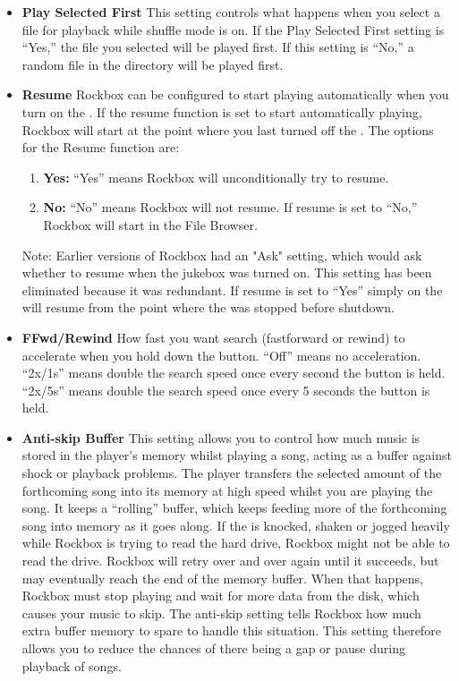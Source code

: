 \begin{itemize}
  \item \textbf{Play Selected First}
    This setting controls what happens when you select a file for playback while shuffle mode is on. If the Play Selected First setting is ``Yes,'' the file you selected will be played first. If this setting is ``No,'' a random file in the directory will be played first.
  \item \textbf{Resume}
    Rockbox can be configured to start playing automatically when you turn on the \dap.  If the resume function is set to start automatically playing, Rockbox will start at the point where you last turned off the \dap.  The options for the Resume function are:
    \begin{enumerate}
    \item\textbf{Yes:  }``Yes'' means Rockbox will unconditionally try to resume.
    \item\textbf{No:  }``No'' means Rockbox will not resume. If resume is set to ``No,'' Rockbox will start in the File Browser.
    \end{enumerate}
    Note:  Earlier versions of Rockbox had an "Ask" setting, which would ask whether to resume when the jukebox was turned on. This setting has been eliminated because it was redundant. If resume is set to ``Yes'' simply on the \dap will resume from the point where the \dap was stopped before shutdown.

  \item \textbf{FFwd/Rewind}
    How fast you want search (fastforward or rewind) to accelerate when you hold down the button. ``Off'' means no acceleration. ``2x/1s'' means double the search speed once every second the button is held. ``2x/5s'' means double the search speed once every 5 seconds the button is held.

  \item \textbf{Anti-skip Buffer}
  This setting allows you to control how much music is stored in the player's memory whilst playing a song, acting as a buffer against shock or playback problems.  The player transfers the selected amount of the forthcoming song into its memory at high speed whilst you are playing the song. It keeps a ``rolling'' buffer, which keeps feeding more of the forthcoming song into memory as it goes along. If the \dap is knocked, shaken or jogged heavily while Rockbox is trying to read the hard drive, Rockbox might not be able to read the drive.  Rockbox will retry over and over again until it succeeds, but may eventually reach the end of the memory buffer.  When that happens, Rockbox must stop playing and wait for more data from the disk, which causes your music to skip.  The anti-skip setting tells Rockbox how much extra buffer memory to spare to handle this situation.  This setting therefore allows you to reduce the chances of there being a gap or pause during playback of songs.


\end{itemize}
